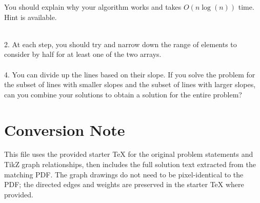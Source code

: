 \documentclass[12pt]{article}
\begin{document}
You should explain why your algorithm works and takes $O(n \log(n))$ time. Hint is available.

\vspace{10mm} 
\\
2. At each step, you should try and narrow down the range of elements to consider by half for at least one of the two arrays.\\
\\
4. You can divide up the lines based on their slope. If you solve the problem for the subset of lines with smaller slopes and the subset of lines with larger slopes, can you combine your solutions to obtain a solution for the entire problem?


\newpage
\section*{Conversion Note}
This file uses the provided starter TeX for the original problem statements and TikZ graph relationships, then includes the full solution text extracted from the matching PDF. The graph drawings do not need to be pixel-identical to the PDF; the directed edges and weights are preserved in the starter TeX where provided.

\newpage
\end{document}
